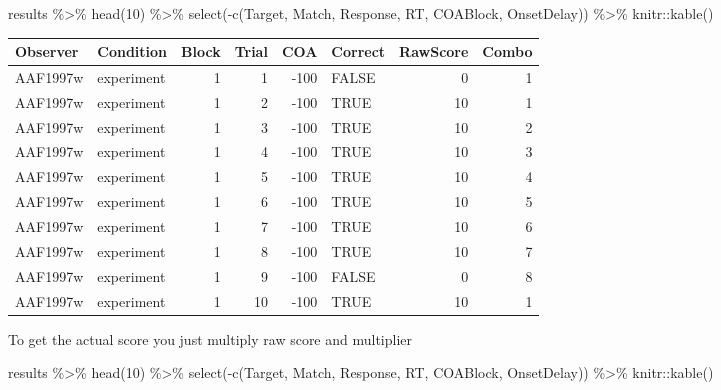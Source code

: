\documentclass[
]{book}
\newenvironment{Shaded}{\begin{snugshade}}{\end{snugshade}}
\newcommand{\DecValTok}[1]{\textcolor[rgb]{0.00,0.00,0.81}{#1}}
\newcommand{\FunctionTok}[1]{\textcolor[rgb]{0.00,0.00,0.00}{#1}}
\newcommand{\NormalTok}[1]{#1}
\newcommand{\SpecialCharTok}[1]{\textcolor[rgb]{0.00,0.00,0.00}{#1}}
\begin{document}
\begin{Shaded}
\begin{Highlighting}[]
\NormalTok{results }\SpecialCharTok{\%\textgreater{}\%}
  \FunctionTok{head}\NormalTok{(}\DecValTok{10}\NormalTok{) }\SpecialCharTok{\%\textgreater{}\%}
  \FunctionTok{select}\NormalTok{(}\SpecialCharTok{{-}}\FunctionTok{c}\NormalTok{(Target, Match, Response, RT, COABlock, OnsetDelay)) }\SpecialCharTok{\%\textgreater{}\%}
\NormalTok{  knitr}\SpecialCharTok{::}\FunctionTok{kable}\NormalTok{()}
\end{Highlighting}
\end{Shaded}

\begin{tabular}{l|l|r|r|r|l|r|r}
\hline
Observer & Condition & Block & Trial & COA & Correct & RawScore & Combo\\
\hline
AAF1997w & experiment & 1 & 1 & -100 & FALSE & 0 & 1\\
\hline
AAF1997w & experiment & 1 & 2 & -100 & TRUE & 10 & 1\\
\hline
AAF1997w & experiment & 1 & 3 & -100 & TRUE & 10 & 2\\
\hline
AAF1997w & experiment & 1 & 4 & -100 & TRUE & 10 & 3\\
\hline
AAF1997w & experiment & 1 & 5 & -100 & TRUE & 10 & 4\\
\hline
AAF1997w & experiment & 1 & 6 & -100 & TRUE & 10 & 5\\
\hline
AAF1997w & experiment & 1 & 7 & -100 & TRUE & 10 & 6\\
\hline
AAF1997w & experiment & 1 & 8 & -100 & TRUE & 10 & 7\\
\hline
AAF1997w & experiment & 1 & 9 & -100 & FALSE & 0 & 8\\
\hline
AAF1997w & experiment & 1 & 10 & -100 & TRUE & 10 & 1\\
\hline
\end{tabular}

To get the actual score you just multiply raw score and multiplier

\begin{Shaded}
\begin{Highlighting}[]
\NormalTok{results }\SpecialCharTok{\%\textgreater{}\%}
  \FunctionTok{head}\NormalTok{(}\DecValTok{10}\NormalTok{) }\SpecialCharTok{\%\textgreater{}\%}
  \FunctionTok{select}\NormalTok{(}\SpecialCharTok{{-}}\FunctionTok{c}\NormalTok{(Target, Match, Response, RT, COABlock, OnsetDelay)) }\SpecialCharTok{\%\textgreater{}\%}
\NormalTok{  knitr}\SpecialCharTok{::}\FunctionTok{kable}\NormalTok{()}
\end{Highlighting}
\end{Shaded}
\end{document}
